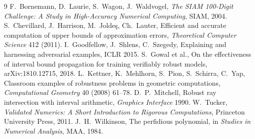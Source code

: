 \documentclass[11pt,a4paper]{article}
\begin{document}
\begin{thebibliography}{9}\small
{} F.~Bornemann, D.~Laurie, S.~Wagon, J.~Waldvogel, \emph{The SIAM 100-Digit
Challenge: A Study in High-Accuracy Numerical Computing}, SIAM, 2004.
 S.~Chevillard, J.~Harrison, M.~Joldeş, Ch.~Lauter, Efficient and accurate
computation of upper bounds of approximation errors, \emph{Theoretical Computer Science} 412 (2011).
 I.~Goodfellow, J.~Shlens, C.~Szegedy, Explaining and harnessing adversarial
examples, ICLR 2015.
 S.~Gowal et al., On the effectiveness of interval bound propagation for training
verifiably robust models, arXiv:1810.12715, 2018.
 L.~Kettner, K.~Mehlhorn, S.~Pion, S.~Schirra, C.~Yap, Classroom examples of
robustness problems in geometric computations, \emph{Computational Geometry} 40 (2008) 61--78.
 D.~P.~Mitchell, Robust ray intersection with interval arithmetic,
\emph{Graphics Interface} 1990.
 W.~Tucker, \emph{Validated Numerics: A Short Introduction to Rigorous
Computations}, Princeton University Press, 2011.
 J.~H.~Wilkinson, The perfidious polynomial, in \emph{Studies in Numerical
Analysis}, MAA, 1984.
\end{thebibliography}
\end{document}
